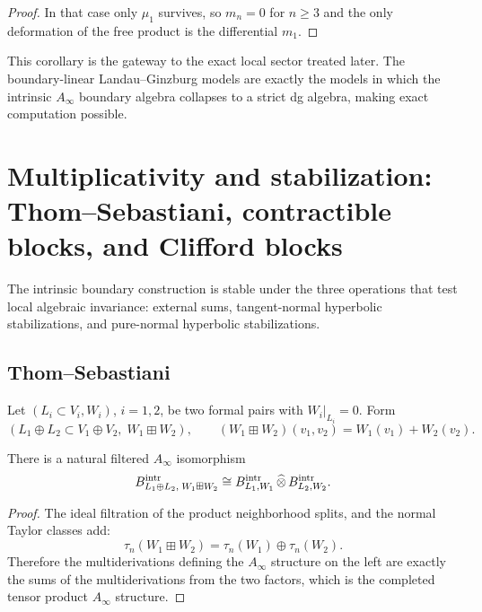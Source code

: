 \begin{proof}
In that case only $\mu_1$ survives, so $m_n=0$ for $n\ge 3$ and the only deformation of the free product is the differential $m_1$.
\end{proof}

\begin{remark}
This corollary is the gateway to the exact local sector treated later. The boundary-linear Landau--Ginzburg models are exactly the models in which the intrinsic $A_\infty$ boundary algebra collapses to a strict dg algebra, making exact computation possible.
\end{remark}


\section{Multiplicativity and stabilization: Thom--Sebastiani, contractible blocks, and Clifford blocks}%

The intrinsic boundary construction is stable under the three operations that test local algebraic invariance: external sums, tangent-normal hyperbolic stabilizations, and pure-normal hyperbolic stabilizations.

\subsection{Thom--Sebastiani}

Let $(L_i\subset V_i,W_i)$, $i=1,2$, be two formal pairs with $W_i|_{L_i}=0$. Form
\[
(L_1\oplus L_2 \subset V_1\oplus V_2,\; W_1\boxplus W_2),
\qquad
(W_1\boxplus W_2)(v_1,v_2)=W_1(v_1)+W_2(v_2).
\]

\begin{theorem}%
There is a natural filtered $A_\infty$ isomorphism
\[
B^{\mathrm{intr}}_{L_1\oplus L_2,\;W_1\boxplus W_2}
\cong
B^{\mathrm{intr}}_{L_1,W_1}\,\widehat{\otimes}\, B^{\mathrm{intr}}_{L_2,W_2}.
\]
\end{theorem}

\begin{proof}
The ideal filtration of the product neighborhood splits, and the normal Taylor classes add:
\[
\tau_n(W_1\boxplus W_2)=\tau_n(W_1)\oplus \tau_n(W_2).
\]
Therefore the multiderivations defining the $A_\infty$ structure on the left are exactly the sums of the multiderivations from the two factors, which is the completed tensor product $A_\infty$ structure.
\end{proof}

